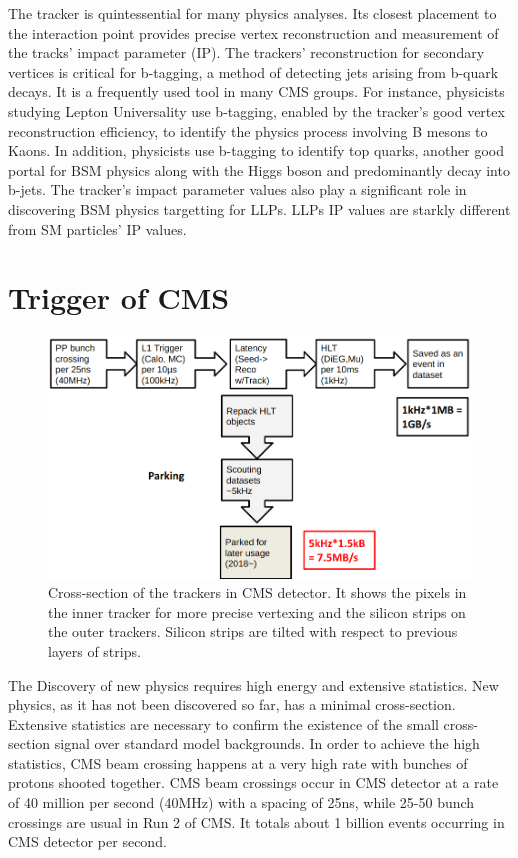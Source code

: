 The tracker is quintessential for many physics analyses.
Its closest placement to the interaction point provides precise vertex reconstruction and measurement of the tracks' impact parameter (IP).
The trackers' reconstruction for secondary vertices is critical for b-tagging, a method of detecting jets arising from b-quark decays.
It is a frequently used tool in many CMS groups.
For instance, physicists studying Lepton Universality use b-tagging, enabled by the tracker's good vertex reconstruction efficiency, to identify the physics process involving B mesons to Kaons.
In addition, physicists use b-tagging to identify top quarks, another good portal for BSM physics along with the Higgs boson and predominantly decay into b-jets.
The tracker's impact parameter values also play a significant role in discovering BSM physics targetting for LLPs.
LLPs IP values are starkly different from SM particles' IP values.


\section{Trigger of CMS}
\begin{figure}[h!]
	\caption{Cross-section of the trackers in CMS detector. It shows the pixels in the inner tracker for more precise vertexing and the silicon strips on the outer trackers. Silicon strips are tilted with respect to previous layers of strips. \cite{trk}}
  \label{fig:trig}
  \centering
  \includegraphics[width=0.95\linewidth]{figs/Trig.png}
\end{figure}
The Discovery of new physics requires high energy and extensive statistics.
New physics, as it has not been discovered so far, has a minimal cross-section.
Extensive statistics are necessary to confirm the existence of the small cross-section signal over standard model backgrounds.
In order to achieve the high statistics, CMS beam crossing happens at a very high rate with bunches of protons shooted together.
CMS beam crossings occur in CMS detector at a rate of 40 million per second (40MHz) with a spacing of 25ns, while 25-50 bunch crossings are usual in Run 2 of CMS.
It totals about 1 billion events occurring in CMS detector per second.

